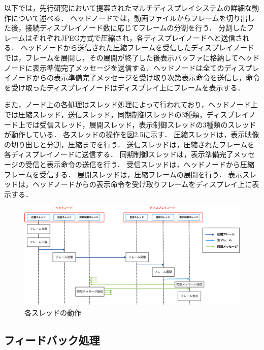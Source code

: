 以下では，先行研究において提案されたマルチディスプレイシステムの詳細な動作について述べる．
ヘッドノードでは，動画ファイルからフレームを切り出した後，接続ディスプレイノード数に応じてフレームの分割を行う．
分割したフレームはそれぞれJPEG方式で圧縮され，各ディスプレイノードへと送信される．
ヘッドノードから送信された圧縮フレームを受信したディスプレイノードでは，フレームを展開し，その展開が終了した後表示バッファに格納してヘッドノードに表示準備完了メッセージを送信する．ヘッドノードは全てのディスプレイノードからの表示準備完了メッセージを受け取り次第表示命令を送信し，命令を受け取ったディスプレイノードはディスプレイ上にフレームを表示する．

また，ノード上の各処理はスレッド処理によって行われており，ヘッドノード上では圧縮スレッド，送信スレッド，同期制御スレッドの3種類，ディスプレイノード上では受信スレッド，展開スレッド，表示制御スレッドの3種類のスレッドが動作している．
各スレッドの操作を図2.5に示す．
圧縮スレッドは，表示映像の切り出しと分割，圧縮までを行う．
送信スレッドは，圧縮されたフレームを各ディスプレイノードに送信する．
同期制御スレッドは，表示準備完了メッセージの受信と表示命令の送信を行う．
受信スレッドは，ヘッドノードから圧縮フレームを受信する．
展開スレッドは，圧縮フレームの展開を行う．
表示スレッドは，ヘッドノードからの表示命令を受け取りフレームをディスプレイ上に表示する．

\begin{center}
  \begin{figure}[H]
      \hspace*{\fill}
      \includegraphics[width=1.1\linewidth]{./fig/frow_system.eps}
      \hspace*{\fill}
      \caption{各スレッドの動作}
  \end{figure}
  \end{center}
   

\subsection{フィードバック処理}


